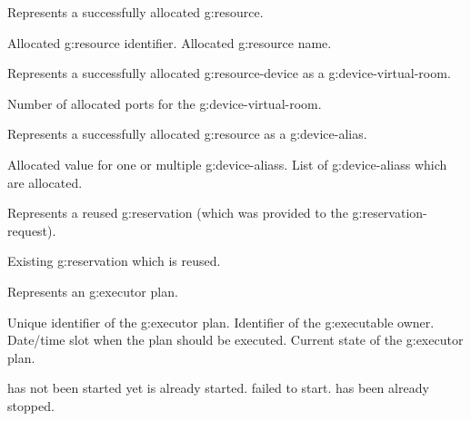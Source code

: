 \begin{Api}
Represents a successfully allocated \gls{g:resource}.
\begin{ApiClassAttributes}
 Allocated \gls{g:resource} identifier.
 Allocated \gls{g:resource} name. 
\end{ApiClassAttributes}

Represents a successfully allocated \gls{g:resource-device} as a \gls{g:device-virtual-room}.
\begin{ApiClassAttributes}
 Number of allocated ports for the \gls{g:device-virtual-room}.
\end{ApiClassAttributes}

Represents a successfully allocated \gls{g:resource} as a \gls{g:device-alias}.
\begin{ApiClassAttributes}
 Allocated value for one or multiple \glspl{g:device-alias}.
 List of \glspl{g:device-alias} which are allocated.
\end{ApiClassAttributes}

Represents a reused \gls{g:reservation} (which was provided to the \gls{g:reservation-request}).
\begin{ApiClassAttributes}
 Existing \gls{g:reservation} which is reused.
\end{ApiClassAttributes}

Represents an \gls{g:executor} plan.
\begin{ApiClassAttributes}
 Unique identifier of the \gls{g:executor} plan.
 Identifier of the \gls{g:executable} owner.
 Date/time slot when the plan should be executed.
 Current state of the \gls{g:executor} plan.
\end{ApiClassAttributes}

\begin{ApiEnumValues}
  has not been started yet
  is already started.
  failed to start.
  has been already stopped.
\end{ApiEnumValues}


\end{Api}
